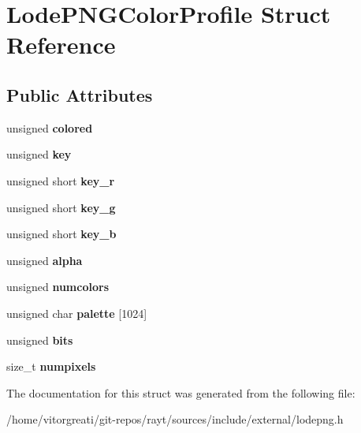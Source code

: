 \hypertarget{struct_lode_p_n_g_color_profile}{}\section{Lode\+P\+N\+G\+Color\+Profile Struct Reference}
\label{struct_lode_p_n_g_color_profile}
\subsection*{Public Attributes}
\begin{DoxyCompactItemize}
\item 
\mbox{\label{struct_lode_p_n_g_color_profile_abf063a566a4ab9f4d71b49764573d610}} 
unsigned {\bfseries colored}
\item 
\mbox{\label{struct_lode_p_n_g_color_profile_a24f19f400a53672340877eefbc837b0c}} 
unsigned {\bfseries key}
\item 
\mbox{\label{struct_lode_p_n_g_color_profile_a0398985ae0572ef97e83c33c7486cafd}} 
unsigned short {\bfseries key\+\_\+r}
\item 
\mbox{\label{struct_lode_p_n_g_color_profile_aba03e973374bd15315b8c01b86e94e8f}} 
unsigned short {\bfseries key\+\_\+g}
\item 
\mbox{\label{struct_lode_p_n_g_color_profile_a39b65ec69f6aaee3ee7312a993f21e40}} 
unsigned short {\bfseries key\+\_\+b}
\item 
\mbox{\label{struct_lode_p_n_g_color_profile_a554fea329af8034e91e1cdd8c1af0d90}} 
unsigned {\bfseries alpha}
\item 
\mbox{\label{struct_lode_p_n_g_color_profile_afdce0f5fbec46d6b8f1ec63da0a285f9}} 
unsigned {\bfseries numcolors}
\item 
\mbox{\label{struct_lode_p_n_g_color_profile_a223f8bee4c9ae8be0b70cc08f19aaead}} 
unsigned char {\bfseries palette} \mbox{[}1024\mbox{]}
\item 
\mbox{\label{struct_lode_p_n_g_color_profile_a1d3870b03dfe6d699bf4c968c9bc1890}} 
unsigned {\bfseries bits}
\item 
\mbox{\label{struct_lode_p_n_g_color_profile_a12de3184a6f953e34e2b8551b806f556}} 
size\+\_\+t {\bfseries numpixels}
\end{DoxyCompactItemize}


The documentation for this struct was generated from the following file\+:\begin{DoxyCompactItemize}
\item 
/home/vitorgreati/git-\/repos/rayt/sources/include/external/lodepng.\+h\end{DoxyCompactItemize}
